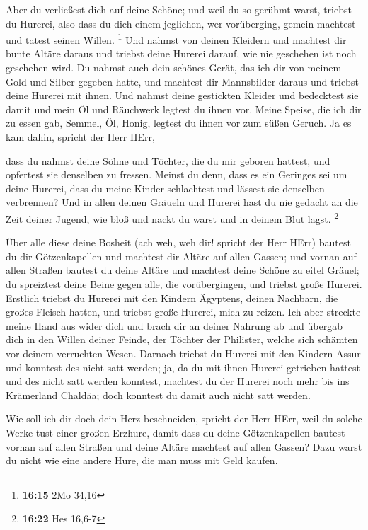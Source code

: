 Aber du verließest dich auf deine Schöne; und weil du so
gerühmt warst, triebst du Hurerei, also dass du dich einem jeglichen,
wer vorüberging, gemein machtest und tatest seinen Willen. \footnote{\textbf{16:15}
  2Mo 34,16}  Und nahmst von deinen Kleidern und machtest
dir bunte Altäre daraus und triebst deine Hurerei darauf, wie nie
geschehen ist noch geschehen wird.  Du nahmst auch dein
schönes Gerät, das ich dir von meinem Gold und Silber gegeben hatte, und
machtest dir Mannsbilder daraus und triebst deine Hurerei mit ihnen.
 Und nahmst deine gestickten Kleider und bedecktest sie
damit und mein Öl und Räuchwerk legtest du ihnen vor. 
Meine Speise, die ich dir zu essen gab, Semmel, Öl, Honig, legtest du
ihnen vor zum süßen Geruch. Ja es kam dahin, spricht der Herr HErr,

 dass du nahmst deine Söhne und Töchter, die du mir geboren
hattest, und opfertest sie denselben zu fressen. Meinst du denn, dass es
ein Geringes sei um deine Hurerei,  dass du meine Kinder
schlachtest und lässest sie denselben verbrennen?  Und in
allen deinen Gräueln und Hurerei hast du nie gedacht an die Zeit deiner
Jugend, wie bloß und nackt du warst und in deinem Blut lagst.
\footnote{\textbf{16:22} Hes 16,6-7}

 Über alle diese deine Bosheit (ach weh, weh dir! spricht
der Herr HErr)  bautest du dir Götzenkapellen und machtest
dir Altäre auf allen Gassen;  und vornan auf allen Straßen
bautest du deine Altäre und machtest deine Schöne zu eitel Gräuel; du
spreiztest deine Beine gegen alle, die vorübergingen, und triebst große
Hurerei.  Erstlich triebst du Hurerei mit den Kindern
Ägyptens, deinen Nachbarn, die großes Fleisch hatten, und triebst große
Hurerei, mich zu reizen.  Ich aber streckte meine Hand aus
wider dich und brach dir an deiner Nahrung ab und übergab dich in den
Willen deiner Feinde, der Töchter der Philister, welche sich schämten
vor deinem verruchten Wesen.  Darnach triebst du Hurerei
mit den Kindern Assur und konntest des nicht satt werden; ja, da du mit
ihnen Hurerei getrieben hattest und des nicht satt werden konntest,
 machtest du der Hurerei noch mehr bis ins Krämerland
Chaldäa; doch konntest du damit auch nicht satt werden.

 Wie soll ich dir doch dein Herz beschneiden, spricht der
Herr HErr, weil du solche Werke tust einer großen Erzhure, 
damit dass du deine Götzenkapellen bautest vornan auf allen Straßen und
deine Altäre machtest auf allen Gassen? Dazu warst du nicht wie eine
andere Hure, die man muss mit Geld kaufen.

